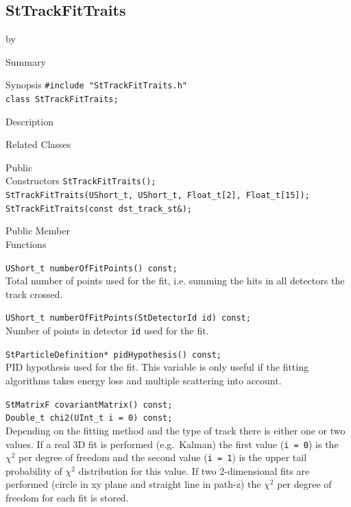 \documentclass[twoside]{article}
\newcommand{\entrylabel}[1]{\mbox{\textbf{{#1}}}\hfil}%
\newenvironment{entry}
{\begin{list}{}%
    {\renewcommand{\makelabel}{\entrylabel}%
     \setlength{\labelwidth}{90pt}%
     \setlength{\leftmargin}{\labelwidth}
     \advance\leftmargin by \labelsep%
      }%
    }%
  {\end{list}}
\newcommand{\Entrylabel}[1]%
{\raisebox{0pt}[1ex][0pt]{\makebox[\labelwidth][l]%
    {\parbox[t]{\labelwidth}{\hspace{0pt}\textbf{{#1}}}}}}
\newenvironment{Entry}%
{\renewcommand{\entrylabel}{\Entrylabel}\begin{entry}}%
  {\end{entry}}
\begin{document}
\subsection{StTrackFitTraits}
\label{sec:StTrackFitTraits}
\begin{Entry}
\item[Summary]
\item[Synopsis]
    \verb+#include "StTrackFitTraits.h"+\\
    \verb+class StTrackFitTraits;+\\
\item[Description]
\item[Related Classes]
\item[Public\\ Constructors]
    \verb+StTrackFitTraits();+\\
    \verb+StTrackFitTraits(UShort_t, UShort_t, Float_t[2], Float_t[15]);+\\
    \verb+StTrackFitTraits(const dst_track_st&);+\\
\item[Public Member\\ Functions]
    
    \verb+UShort_t numberOfFitPoints() const;+\\
    Total number of points used for the fit, i.e. summing the
    hits in all detectors the track crossed.
    
    \verb+UShort_t numberOfFitPoints(StDetectorId id) const;+\\
    Number of points in detector \texttt{id} used for the fit.
    
    \verb+StParticleDefinition* pidHypothesis() const;+\\
    PID hypothesis used for the fit. This variable is only
    useful if the fitting algorithms takes energy loss and
    multiple scattering into account.
    
    \verb+StMatrixF covariantMatrix() const;+\\

    \verb+Double_t chi2(UInt_t i = 0) const;+\\
    Depending on the fitting method and the type of track there is either
    one or two values.
    If a real 3D fit is performed (e.g.~Kalman) the first value (\texttt{i = 0}) is the
    $\chi^2$ per degree of freedom and the second value (\texttt{i = 1}) is the
    upper tail probability of $\chi^2$ distribution for this value.
    If two 2-dimensional fits are performed (circle in xy plane and straight line in path-z)
    the $\chi^2$ per degree of freedom for each fit is stored.
     

\end{Entry}
\clearpage
\end{document}
